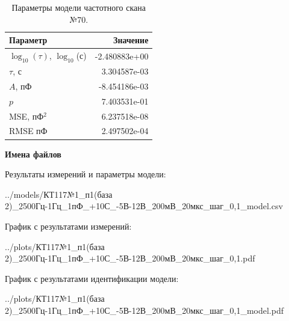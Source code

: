 \begin{table}[!ht]
    \centering
    \caption{Параметры модели частотного скана №70.}
    \begin{tabular}{|l|r|}
        \hline
        Параметр                                       & Значение                  \\ \hline
        $\log_{10}(\tau)$, $\log_{10}$(с)              & -2.480883e+00             \\ \hline
        $\tau$, с                                      & 3.304587e-03              \\ \hline
        $A$, пФ                                        & -8.454186e-03             \\ \hline
        $p$                                            & 7.403531e-01              \\ \hline
        MSE, пФ$^2$                                    & 6.237518e-08              \\ \hline
        RMSE пФ                                        & 2.497502e-04              \\ \hline
    \end{tabular}
    \label{table:frequency_scan_model_70}
\end{table}

\textbf{Имена файлов}

Результаты измерений и параметры модели:

\scriptsize../models/КТ117№1\_п1(база 2)\_2500Гц-1Гц\_1пФ\_+10С\_-5В-12В\_200мВ\_20мкс\_шаг\_0,1\_model.csv
\normalsize

График с результатами измерений:

\scriptsize../plots/КТ117№1\_п1(база 2)\_2500Гц-1Гц\_1пФ\_+10С\_-5В-12В\_200мВ\_20мкс\_шаг\_0,1.pdf
\normalsize

График с результатами идентификации модели:

\scriptsize../plots/КТ117№1\_п1(база 2)\_2500Гц-1Гц\_1пФ\_+10С\_-5В-12В\_200мВ\_20мкс\_шаг\_0,1\_model.pdf
\normalsize

